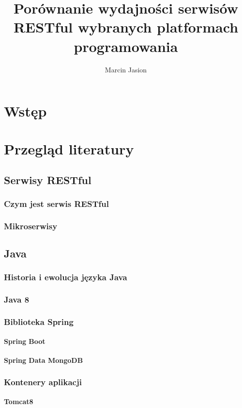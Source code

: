 \documentclass[a4paper,12pt,twoside,openany]{report}
\title{Porównanie wydajności serwisów RESTful wybranych platformach programowania}
\author{Marcin Jasion}
\begin{document}
\maketitle

\chapter{Wstęp}

\chapter{Przegląd literatury}
\section{Serwisy RESTful}
\subsection{Czym jest serwis RESTful}
\subsection{Mikroserwisy}

\section{Java}
\subsection{Historia i ewolucja języka Java}
\subsection{Java 8}
\subsection{Biblioteka Spring}
\subsubsection{Spring Boot}
\subsubsection{Spring Data MongoDB}
\subsection{Kontenery aplikacji}
\subsubsection{Tomcat8}
\end{document}
